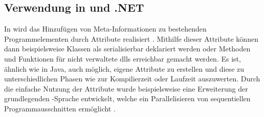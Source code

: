 \subsection{Verwendung in \texorpdfstring{\csharpbold}{C\#} und .NET}
\label{verwendung_in_c_sharp_dot_net}
In \csharp{} wird das Hinzufügen von Meta-Informationen zu bestehenden Programmelementen durch Attribute realisiert \cite{Albahari2019}. Mithilfe dieser Attribute können dann beispielsweise Klassen als serialisierbar deklariert werden oder Methoden und Funktionen für nicht verwaltete \acp{dll} erreichbar gemacht werden. Es ist, ähnlich wie in Java, auch möglich, eigene Attribute zu erstellen und diese zu unterschiedlichen Phasen wie zur Kompilierzeit oder Laufzeit auszuwerten. Durch die einfache Nutzung der Attribute wurde beispielsweise eine Erweiterung der grundlegenden \csharp-Sprache entwickelt, welche ein Parallelisieren von sequentiellen Programmausschnitten ermöglicht \cite{Cazzola2005}. 


